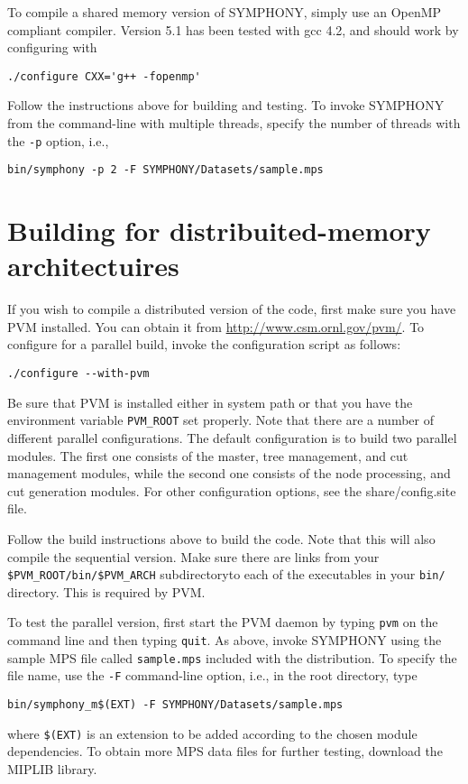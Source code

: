 To compile a shared memory version of SYMPHONY, simply use an OpenMP compliant
compiler. Version 5.1 has been tested with gcc 4.2, and should work by
configuring with
\begin{verbatim}
./configure CXX='g++ -fopenmp'
\end{verbatim}
Follow the instructions above for building and testing. To invoke SYMPHONY
from the command-line with multiple threads, specify the number of threads
with the \texttt{-p} option, i.e.,
\begin{verbatim}
bin/symphony -p 2 -F SYMPHONY/Datasets/sample.mps
\end{verbatim}

\section{Building for distribuited-memory architectuires}

If you wish to compile a distributed version of the code, first make sure
you have PVM installed. You can obtain it from
\url{http://www.csm.ornl.gov/pvm/}. To configure for a parallel build, invoke
the configuration script as follows:
\begin{verbatim}
./configure --with-pvm
\end{verbatim}
Be sure that PVM is installed either in system path or that you have the
environment variable \texttt{PVM\_ROOT} set properly. Note that there are a
number of different parallel configurations. The default configuration is to
build two parallel modules. The first one consists of the master, tree
management, and cut management modules, while the second one consists of the
node processing, and cut generation modules. For other configuration options,
see the share/config.site file.

Follow the build instructions above to build the code. Note that this will
also compile the sequential version. Make sure there are links from your
\texttt{\$PVM\_ROOT/bin/\$PVM\_ARCH} subdirectoryto each of the executables in
your \texttt{bin/} directory. This is required by PVM.

To test the parallel version, first start the PVM daemon by typing
\texttt{pvm} on the command line and then typing \texttt{quit}. As above,
invoke SYMPHONY using the sample MPS file called \texttt{sample.mps} included
with the distribution. To specify the file name, use the \texttt{-F}
command-line option, i.e., in the root directory, type
\begin{verbatim}
bin/symphony_m$(EXT) -F SYMPHONY/Datasets/sample.mps 
\end{verbatim}
where \texttt{\$(EXT)} is an extension to be added according to the chosen
module dependencies. To obtain more MPS data files for further testing,
download the MIPLIB library.

